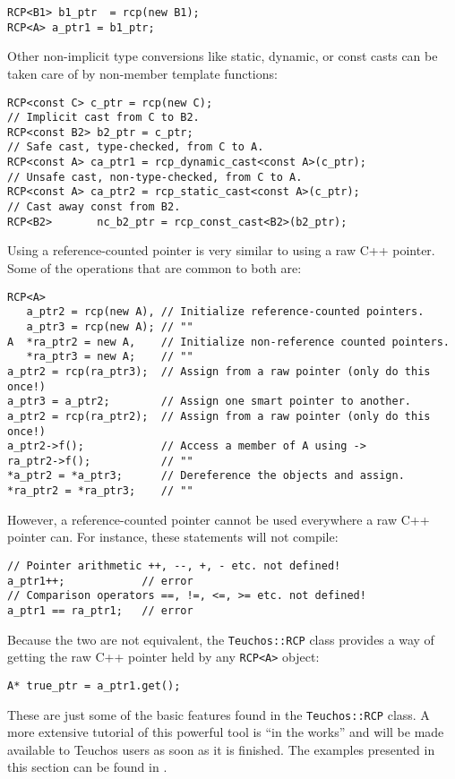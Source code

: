 {\small
\begin{verbatim}
RCP<B1> b1_ptr  = rcp(new B1);
RCP<A> a_ptr1 = b1_ptr;
\end{verbatim}}

\noindent Other non-implicit type conversions like static, dynamic, or const casts
can be taken care of by non-member template functions:

{\small
\begin{verbatim}
RCP<const C> c_ptr = rcp(new C);
// Implicit cast from C to B2.
RCP<const B2> b2_ptr = c_ptr;                              
// Safe cast, type-checked, from C to A.
RCP<const A> ca_ptr1 = rcp_dynamic_cast<const A>(c_ptr); 
// Unsafe cast, non-type-checked, from C to A.
RCP<const A> ca_ptr2 = rcp_static_cast<const A>(c_ptr);  
// Cast away const from B2.
RCP<B2>       nc_b2_ptr = rcp_const_cast<B2>(b2_ptr);           
\end{verbatim}}

Using a reference-counted pointer is very similar to using a raw C++ pointer.  Some
of the operations that are common to both are:
{\small
\begin{verbatim}
RCP<A>
   a_ptr2 = rcp(new A), // Initialize reference-counted pointers.
   a_ptr3 = rcp(new A); // ""
A  *ra_ptr2 = new A,    // Initialize non-reference counted pointers.
   *ra_ptr3 = new A;    // ""
a_ptr2 = rcp(ra_ptr3);  // Assign from a raw pointer (only do this once!)
a_ptr3 = a_ptr2;        // Assign one smart pointer to another.
a_ptr2 = rcp(ra_ptr2);  // Assign from a raw pointer (only do this once!)
a_ptr2->f();            // Access a member of A using ->
ra_ptr2->f();           // ""
*a_ptr2 = *a_ptr3;      // Dereference the objects and assign.
*ra_ptr2 = *ra_ptr3;    // ""
\end{verbatim}}

\noindent However, a reference-counted pointer cannot be used everywhere a raw C++ pointer
can.  For instance, these statements will not compile:
{\small
\begin{verbatim}
// Pointer arithmetic ++, --, +, - etc. not defined!
a_ptr1++;            // error  
// Comparison operators ==, !=, <=, >= etc. not defined!
a_ptr1 == ra_ptr1;   // error 
\end{verbatim}}

\noindent Because the two are not equivalent, the {\tt Teuchos::RCP} class provides 
a way of getting the raw C++ pointer held by any {\tt RCP<A>} object:
{\small
\begin{verbatim}
A* true_ptr = a_ptr1.get();
\end{verbatim}}
These are just some of the basic features found in the {\tt Teuchos::RCP} class.  
A more extensive tutorial of this powerful tool is ``in the works'' and will be made available
to Teuchos users as soon as it is finished.  The examples presented in this section can be found in
.  

